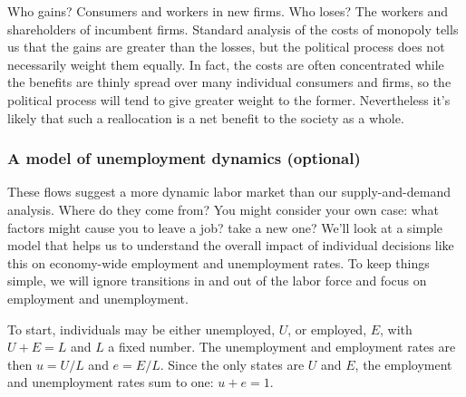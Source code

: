 \documentclass[letterpaper,12pt]{article}
\begin{document}
Who gains? Consumers and workers in new firms. Who loses?
The workers and shareholders of incumbent firms.
Standard analysis of the costs of monopoly tells us
that the gains are greater than the losses,
but the political process does not necessarily weight them
equally.  In fact, the costs are often concentrated while the benefits are thinly spread over many individual consumers and firms,
so the political process will tend to give greater weight to the former.
Nevertheless it's likely that such a reallocation
is a net benefit to the society as a whole.

\subsubsection*{A model of unemployment dynamics (optional)}

These flows suggest a more dynamic labor market than our supply-and-demand
analysis.
Where do they come from?
You might consider your own case:
what factors might cause you to leave a job?   take a new one?
We'll look at a simple model that helps us to understand the overall
impact of individual decisions like this on economy-wide
employment and unemployment rates.
To keep things simple, we will ignore transitions in and out of the labor
force and focus on employment and unemployment.

To start, individuals may be either unemployed, $U$, or employed, $E$, with $U+E={L}$ and $L$ a fixed number.
The unemployment and employment rates are then $u=U/{L}$ and $e=E/{L}$.
Since the only states are $U$ and $E$,
the employment and unemployment rates sum to one: $ u+e=1$.
\end{document}
